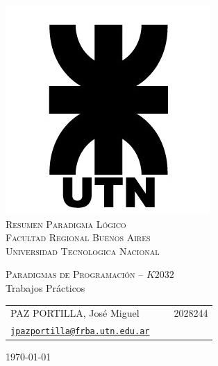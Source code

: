 \begin{titlepage}

\thispagestyle{empty}

\begin{center}
\includegraphics[scale=0.5]{./figuras/logo_utn}\\
\hfill \newline
\large{\textsc{Resumen Paradigma Lógico}}\\
\large{\textsc{Facultad Regional Buenos Aires}}\\
\large{\textsc{Universidad Tecnologica Nacional}}\\
\end{center}

\begin{center}
\LARGE{\textsc{Paradigmas de Programación -- $K2032$}}\\
\hfill \newline
\huge{Trabajos Prácticos}
\end{center}

\vspace{2cm}



\begin{center}
	\begin{tabular}{lc}
		PAZ PORTILLA, José Miguel & \ \ \ 2028244 \\
		\texttt{\href{mailto:jpazportilla@frba.utn.edu.ar}{jpazportilla@frba.utn.edu.ar}}\\
	\end{tabular}
\end{center}

\vspace{1cm}
\begin{center}
\large{\today}
\end{center}

\end{titlepage}

%
%
{
  \hypersetup{linkcolor=black}
  \tableofcontents
}
\thispagestyle{empty}
\newpage
%
%
\setcounter{page}{1}

